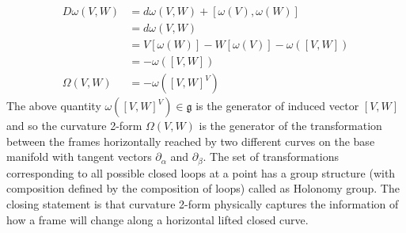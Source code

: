 \documentclass[12pt]{article}
\begin{document}
\begin{align*}
    D\omega(V, W) &= d\omega(V, W) + [\omega(V), \omega(W)] \\
                  &= d\omega(V, W) \\
                  &= V[\omega(W)] - W[\omega(V)] - \omega([V, W]) \\
                  &= -\omega([V, W]) \\
    \Omega(V, W)  &= -\omega([V, W]^{V})
\end{align*}The above quantity $\omega([V, W]^{V})\in \mathfrak{g}$ is the generator of induced vector $[V, W]$ and so the curvature 2-form $\Omega(V, W)$ is the generator of the transformation between the frames horizontally reached by two different curves on the base manifold with tangent vectors $\partial_{\alpha}$ and $\partial_{\beta}$. The set of transformations corresponding to all possible closed loops at a point has a group structure (with composition defined by the composition of loops) called as Holonomy group. The closing statement is that curvature 2-form physically captures the information of how a frame will change along a horizontal lifted closed curve.
\end{document}

